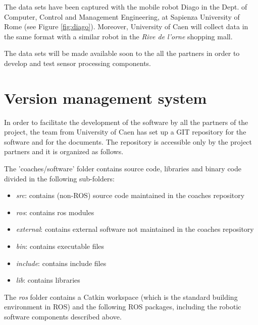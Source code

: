 \documentclass{article}
\begin{document}
The data sets have been captured with the mobile robot Diago in the Dept. of Computer, Control and Management Engineering, at Sapienza University of Rome (see Figure \ref{fig:diago}). Moreover, University of Caen will collect data in the same format with a similar robot in the \emph{Rive de l'orne} shopping mall.

The data sets will be made available soon to the all the partners in order to develop and test sensor processing components.

\section{Version management system}

In order to facilitate the development of the software by all the partners of the project, the team from University of Caen has set up a GIT repository for the software and for the documents.
The repository is accessible only by the project partners and it is organized as follows.

The 'coaches/software' folder contains source code, libraries and binary code divided in the following sub-folders:

\begin{itemize}
\item \emph{src}:       contains (non-ROS) source code maintained in the coaches repository
\item \emph{ros}:       contains ros modules
\item \emph{external}:  contains external software not maintained in the coaches repository
\item \emph{bin}:       contains executable files
\item \emph{include}:   contains include files 
\item \emph{lib}:       contains libraries
\end{itemize}


The \emph{ros} folder contains a Catkin workspace (which is the standard building environment in ROS) and the following ROS packages, including the robotic software components described above.
\end{document}
